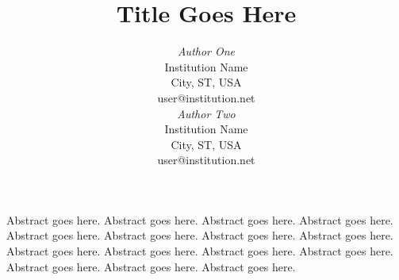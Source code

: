 \documentclass{article}
\begin{document}

\toappear{}



\title{Title Goes Here}

\author{
\parbox[t]{9cm}{\centering
	     {\em Author One}\\
	     Institution Name\\
             City, ST, USA\\
	     user@institution.net}
\parbox[t]{9cm}{\centering
	     {\em Author Two}\\
	     Institution Name\\
             City, ST, USA\\
	     user@institution.net}
}

\maketitle

\abstract Abstract goes here. Abstract goes here. Abstract goes
here. Abstract goes here. Abstract goes here. Abstract goes
here. Abstract goes here. Abstract goes here. Abstract goes
here. Abstract goes here. Abstract goes here. Abstract goes
here. Abstract goes here. Abstract goes here. Abstract goes here.

\end{document}
